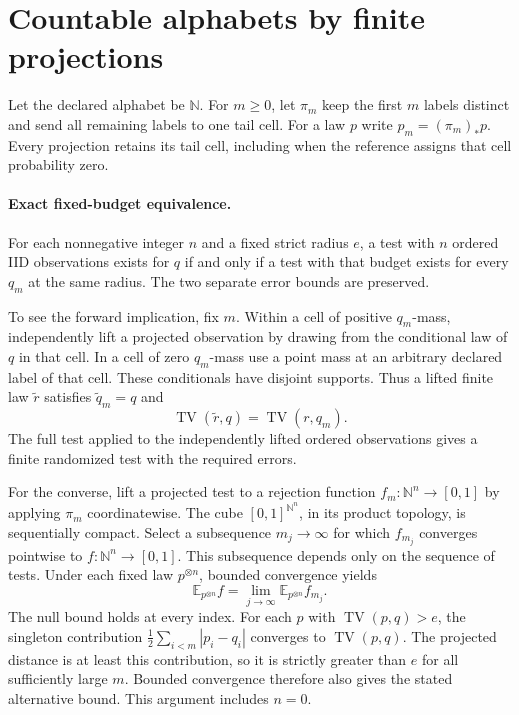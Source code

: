\section{Countable alphabets by finite projections}
\label{sec:countable-projections}

Let the declared alphabet be \(\mathbb N\). For \(m\geq 0\), let
\(\pi_m\) keep the first \(m\) labels distinct and send all remaining
labels to one tail cell. For a law \(p\) write \(p_m=(\pi_m)_*p\).
Every projection retains its tail cell, including when the reference
assigns that cell probability zero.

\paragraph{Exact fixed-budget equivalence.}
For each nonnegative integer \(n\) and a fixed strict radius \(e\),
a test with \(n\) ordered IID observations exists for \(q\) if and only
if a test with that budget exists for every \(q_m\) at the same radius.
The two separate error bounds are preserved.

To see the forward implication, fix \(m\). Within a cell of positive
\(q_m\)-mass, independently lift a projected observation by drawing
from the conditional law of \(q\) in that cell. In a cell of zero
\(q_m\)-mass use a point mass at an arbitrary declared label of that
cell. These conditionals have disjoint supports. Thus a lifted finite
law \(\widetilde r\) satisfies \(\widetilde q_m=q\) and
\[
 \operatorname{TV}(\widetilde r,q)=\operatorname{TV}(r,q_m).
\]
The full test applied to the independently lifted ordered observations
gives a finite randomized test with the required errors.

For the converse, lift a projected test to a rejection function
\(f_m\colon \mathbb N^n\to[0,1]\) by applying \(\pi_m\) coordinatewise.
The cube \([0,1]^{\mathbb N^n}\), in its product topology, is sequentially
compact. Select a subsequence \(m_j\to\infty\) for which \(f_{m_j}\)
converges pointwise to \(f\colon\mathbb N^n\to[0,1]\). This subsequence
depends only on the sequence of tests. Under each fixed law \(p^{\otimes n}\),
bounded convergence yields
\[
 \mathbb E_{p^{\otimes n}} f
   =\lim_{j\to\infty}\mathbb E_{p^{\otimes n}} f_{m_j}.
\]
The null bound holds at every index. For each \(p\) with
\(\operatorname{TV}(p,q)>e\), the singleton contribution
\(\tfrac12\sum_{i<m}|p_i-q_i|\) converges to
\(\operatorname{TV}(p,q)\). The projected distance is at least this
contribution, so it is strictly greater than \(e\) for all sufficiently
large \(m\). Bounded convergence therefore also gives the stated
alternative bound. This argument includes \(n=0\).

